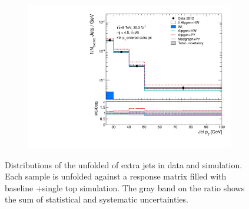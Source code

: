 \begin{figure}
\begin{subfigure}[]{0.45\textwidth}
\end{subfigure}
\begin{subfigure}[]{0.45\textwidth}
\includegraphics[width=\textwidth]{fig/DataUnfold/LOMultiLeg/PtJet3.pdf}
\end{subfigure} 
\caption{Distributions of the unfolded \pt of extra jets in data and simulation. Each sample is unfolded against a response matrix filled with baseline \ttbar+single top simulation. The gray band on the ratio shows the sum of statistical and systematic uncertainties.}
\label{fig:unfptmllo}
\end{figure}
